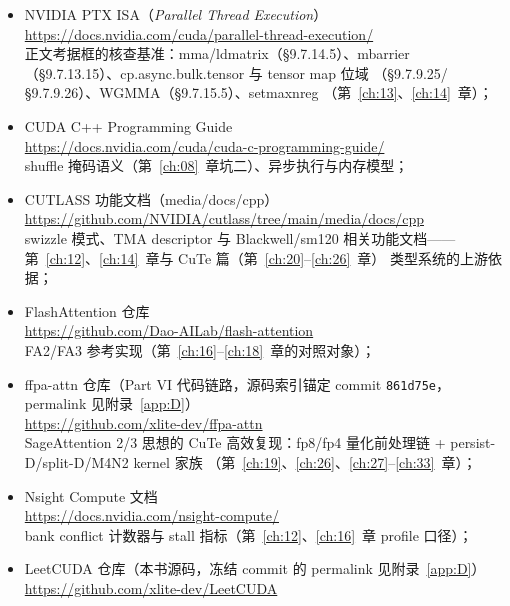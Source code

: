 \begin{itemize}
  \item NVIDIA PTX ISA（\emph{Parallel Thread Execution}）\\
        \url{https://docs.nvidia.com/cuda/parallel-thread-execution/}\\
        正文考据框的核查基准：mma/ldmatrix（§9.7.14.5）、mbarrier
        （§9.7.13.15）、cp.async.bulk.tensor 与 tensor map 位域
        （§9.7.9.25/§9.7.9.26）、WGMMA（§9.7.15.5）、setmaxnreg
        （第~\ref{ch:13}、\ref{ch:14}~章）；
  \item CUDA C++ Programming Guide\\
        \url{https://docs.nvidia.com/cuda/cuda-c-programming-guide/}\\
        shuffle 掩码语义（第~\ref{ch:08}~章坑二）、异步执行与内存模型；
  \item CUTLASS 功能文档（media/docs/cpp）\\
        \url{https://github.com/NVIDIA/cutlass/tree/main/media/docs/cpp}\\
        swizzle 模式、TMA descriptor 与 Blackwell/sm120 相关功能文档——
        第~\ref{ch:12}、\ref{ch:14}~章与 CuTe 篇（第~\ref{ch:20}--\ref{ch:26}~章）
        类型系统的上游依据；
  \item FlashAttention 仓库\\
        \url{https://github.com/Dao-AILab/flash-attention}\\
        FA2/FA3 参考实现（第~\ref{ch:16}--\ref{ch:18}~章的对照对象）；
  \item ffpa-attn 仓库（Part VI 代码链路，源码索引锚定 commit \texttt{861d75e}，
        permalink 见附录~\ref{app:D}）\\
        \url{https://github.com/xlite-dev/ffpa-attn}\\
        SageAttention 2/3 思想的 CuTe 高效复现：fp8/fp4 量化前处理链
        + persist-D/split-D/M4N2 kernel 家族
        （第~\ref{ch:19}、\ref{ch:26}、\ref{ch:27}--\ref{ch:33}~章）；
  \item Nsight Compute 文档\\
        \url{https://docs.nvidia.com/nsight-compute/}\\
        bank conflict 计数器与 stall 指标（第~\ref{ch:12}、\ref{ch:16}~章
        profile 口径）；
  \item LeetCUDA 仓库（本书源码，冻结 commit 的 permalink 见附录~\ref{app:D}）\\
        \url{https://github.com/xlite-dev/LeetCUDA}
\end{itemize}

